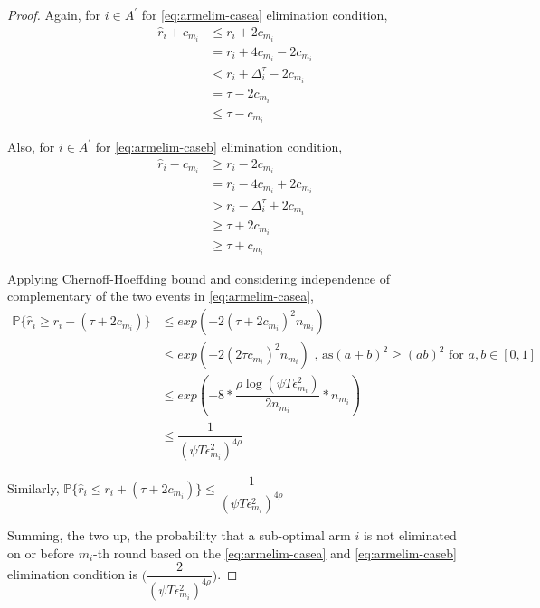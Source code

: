 \begin{proof}
Again, for ${i} \in A^{'}$ for \ref{eq:armelim-casea} elimination condition, 
\begin{align*}
\hat{r}_{i} + c_{m_{i}}&\leq r_{i} + 2c_{m_{i}} \\
&= r_{i} + 4c_{m_{i}} - 2c_{m_{i}} \\
&< r_{i} + \Delta_{i}^{\tau} - 2c_{m_{i}}\\
&= \tau -2c_{m_{i}} \\
&\leq \tau - c_{m_{i}}
\end{align*}

Also, for ${i} \in A^{'}$ for \ref{eq:armelim-caseb} elimination condition, 
\begin{align*}
\hat{r}_{i} - c_{m_{i}}&\geq r_{i} - 2c_{m_{i}} \\
&= r_{i} - 4c_{m_{i}} + 2c_{m_{i}} \\
&> r_{i} - \Delta_{i}^{\tau} + 2c_{m_{i}}\\
&\geq \tau + 2c_{m_{i}} \\
&\geq \tau + c_{m_{i}}
\end{align*}

Applying Chernoff-Hoeffding bound and considering independence of complementary of the two events in \ref{eq:armelim-casea},
  \begin{align*}
\mathbb{P}\lbrace\hat{r}_{i}\geq r_{i} - (\tau + 2c_{m_{i}})\rbrace &\leq exp(-2(\tau + 2c_{m_{i}})^{2}n_{m_{i}})\\
&\leq exp(-2(2\tau c_{m_{i}})^{2}n_{m_{i}}) \text{ , as} (a+b)^{2} \geq (ab)^{2} \text{ for } a,b\in[0,1]\\
&\leq exp(-8 * \dfrac{\rho\log (\psi T\epsilon_{m_{i}}^{2})}{2 n_{m_{i}}} *n_{m_{i}})\\
&\leq \dfrac{1}{(\psi T\epsilon_{m_{i}}^{2})^{4\rho}}   
  \end{align*}
  
Similarly, $\mathbb{P}\lbrace\hat{r}_{i}\leq r_{i} + (\tau + 2c_{m_{i}})\rbrace\leq \dfrac{1}{(\psi  T\epsilon_{m_{i}}^{2})^{4\rho}}$
 
Summing, the two up, the probability that a sub-optimal arm ${i}$ is not eliminated on or before $m_{i}$-th round based on the \ref{eq:armelim-casea} and \ref{eq:armelim-caseb} elimination condition is  $\bigg(\dfrac{2}{(\psi T\epsilon_{m_{i}}^{2})^{4\rho}}\bigg)$. 

%


\end{proof}
